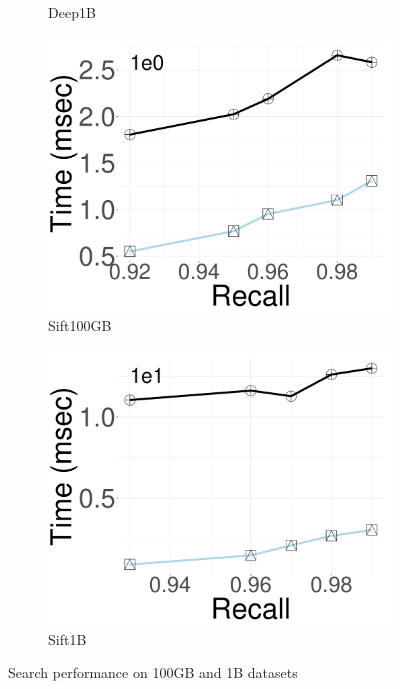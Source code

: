\begin{figure}[ht]
\begin{subfigure}[b]{0.3\textwidth}
                \caption{Deep1B}
        \label{fig:oigas:search:1B:Deep}
    \end{subfigure}

               \begin{subfigure}[b]{0.3\textwidth}
            \centering
                \includegraphics[width=\textwidth]{../img/oigas/Search/FINAL100GB/deep/Time.pdf}
                \caption{Sift100GB}
        \label{fig:oigas:search:100:Sift}
    \end{subfigure}
    \hspace{0.4cm}
            \begin{subfigure}[b]{0.3\textwidth}
            \centering
                \includegraphics[width=\textwidth]{../img/oigas/Search/FINAL1B/sift/Time.pdf}
                \caption{Sift1B}
        \label{fig:oigas:search:1B:Sift}
    \end{subfigure}
    \caption{Search performance on 100GB and 1B datasets}
    \label{fig:oigas:search:Large}
\end{figure}

